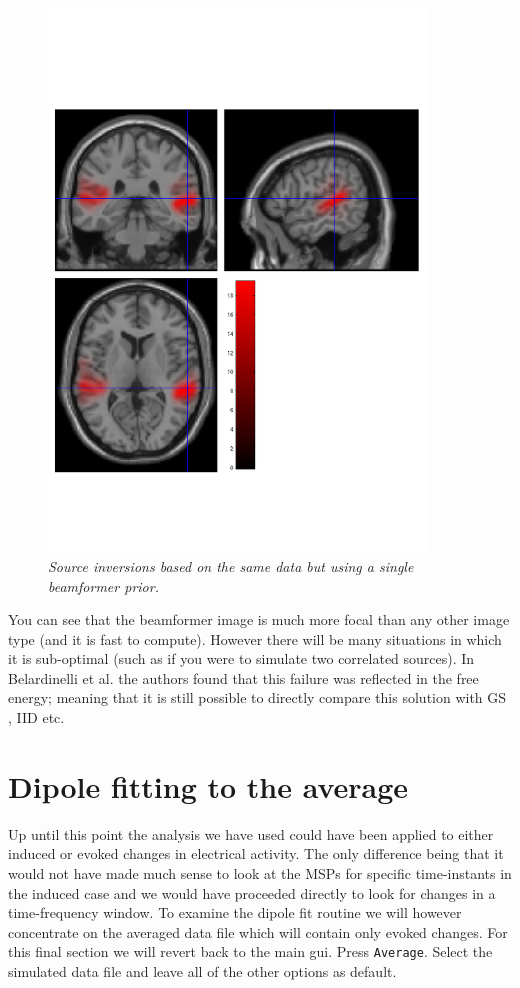 \begin{figure}
\begin{center}
\includegraphics[width=100mm]{meg_sloc/slide8}
\caption{\em  Source inversions based on the same data but using a single beamformer prior.\label{meg_sloc:fig:8}}
\end{center}
\end{figure}

You can see that the beamformer image is much more focal than any other image type (and it is fast to compute). However there will be many situations in which it is sub-optimal (such as if you were to simulate two correlated sources). In Belardinelli et al. the authors found that this failure was reflected in the free energy; meaning that it is still possible to directly compare this solution with GS , IID etc.



\section{Dipole fitting to the average}

 Up until this point the analysis we have used could have been applied to either induced or evoked changes in electrical activity. The only difference being that it would not have made much sense to look at the MSPs for specific time-instants in the induced case and we would have proceeded directly to look for changes in a time-frequency window. To examine the dipole fit routine we will however concentrate on the averaged data file which will contain only evoked changes. 
For this final section we will revert back to the main gui.
Press  \texttt{Average}. Select the simulated data file and leave all of the other options as default.

